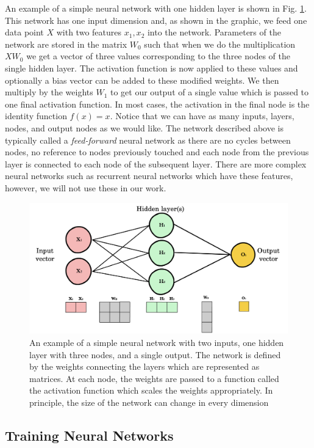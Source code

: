 \documentclass{CUP-JNL-DTM}%
\theoremstyle{definition}
\numberwithin{equation}{section}
\newcommand{\Define}{\emph}
\begin{document}
An example of a simple neural network with one hidden layer is shown in Fig. \ref{fig:NNexample}. This network has one input dimension and, as shown in the graphic, we feed one data point $X$ with two features $x_1, x_2$ into the network. Parameters of the network are stored in the matrix $W_0$ such that when we do the multiplication $X W_0$ we get a vector of three values corresponding to the three nodes of the single hidden layer. The activation function is now applied to these values and optionally a bias vector can be added to these modified weights. We then multiply by the weights $W_1$ to get our output of a single value which is passed to one final activation function. In most cases, the activation in the final node is the identity function $f(x) = x$. Notice that we can have as many inputs, layers, nodes, and output nodes as we would like. The network described above is typically called a \Define{feed-forward} neural network as there are no cycles between nodes, no reference to nodes previously touched and each node from the previous layer is connected to each node of the subsequent layer. There are more complex neural networks such as recurrent neural networks which have these features, however, we will not use these in our work.

\begin{figure}
\centering
\includegraphics[width=0.7\linewidth]{figures/NN_example.png}
\caption{An example of a simple neural network with two inputs, one hidden layer with three nodes, and a single output. The network is defined by the weights connecting the layers which are represented as matrices. At each node, the weights are passed to a function called the activation function which scales the weights appropriately. In principle, the size of the network can change in every dimension}
\label{fig:NNexample}
\end{figure}



\subsection{Training Neural Networks}
\end{document}
